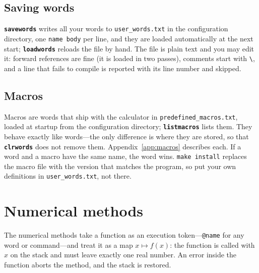 \documentclass[11pt,letterpaper]{article}
\newcommand{\code}[1]{\texttt{#1}}
\newcommand{\cmd}[1]{\texttt{\textbf{#1}}}
\begin{document}
\subsection{Saving words}

\cmd{savewords} writes all your words to \code{user\_words.txt} in the configuration directory, one \code{name body} per line, and they are loaded automatically at the next start; \cmd{loadwords} reloads the file by hand. The file is plain text and you may edit it: forward references are fine (it is loaded in two passes), comments start with \code{\textbackslash}, and a line that fails to compile is reported with its line number and skipped.

\subsection{Macros}

Macros are words that ship with the calculator in \code{predefined\_macros.txt}, loaded at startup from the configuration directory; \cmd{listmacros} lists them. They behave exactly like words---the only difference is where they are stored, so that \cmd{clrwords} does not remove them. Appendix~\ref{app:macros} describes each. If a word and a macro have the same name, the word wins. \code{make install} replaces the macro file with the version that matches the program, so put your own definitions in \code{user\_words.txt}, not there.

\section{Numerical methods}
\label{sec:numerics}

The numerical methods take a function as an execution token---\code{@name} for any word or command---and treat it as a map $x \mapsto f(x)$: the function is called with $x$ on the stack and must leave exactly one real number. An error inside the function aborts the method, and the stack is restored.
\end{document}
